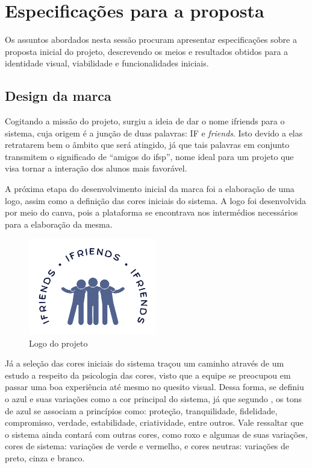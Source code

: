 

\chapter{Especificações para a proposta}

Os assuntos abordados nesta sessão procuram apresentar especificações sobre a proposta inicial do projeto, descrevendo os meios e resultados obtidos para a identidade visual, viabilidade e funcionalidades iniciais.

\section{Design da marca}

Cogitando a missão do projeto, surgiu a ideia de dar o nome \gls{ifriends} para o sistema, cuja origem é a junção de duas palavras: IF e \textsl{friends}. Isto devido a elas retratarem bem o âmbito que será atingido, já que tais palavras em conjunto transmitem o significado de ``amigos do \acs{ifsp}'', nome ideal para um projeto que visa tornar a interação dos alunos mais favorável.

A próxima etapa do desenvolvimento inicial da marca foi a elaboração de uma logo, assim como a definição das cores iniciais do sistema. A logo foi desenvolvida por meio do \gls{canva}, pois a plataforma se encontrava nos intermédios necessários para a elaboração da mesma. 

\begin{figure}[htb]
\centering
\caption{Logo do projeto}
\includegraphics[width=0.5\textwidth]{anexos/logo.png}
\end{figure}
\FloatBarrier

Já a seleção das cores iniciais do sistema traçou um caminho através de um estudo a respeito da psicologia das cores, visto que a equipe se preocupou em passar uma boa experiência até mesmo no quesito visual. Dessa forma, se definiu o azul e suas variações como a cor principal do sistema, já que segundo , os tons de azul se associam a princípios como: proteção, tranquilidade, fidelidade, compromisso, verdade, estabilidade, criatividade, entre outros. Vale ressaltar que o sistema ainda contará com outras cores, como roxo e algumas de suas variações, cores de sistema: variações de verde e vermelho, e cores neutras: variações de preto, cinza e branco.

